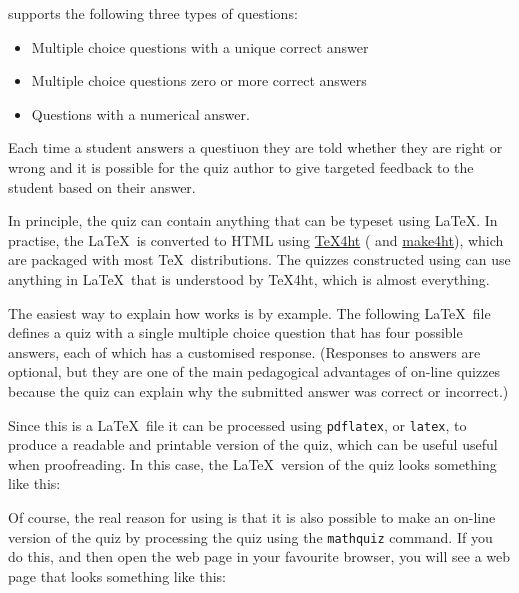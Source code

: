 \documentclass[svgnames]{article}
\begin{document}
    \MathQuiz supports the following three types of questions:
    \begin{itemize}
      \item Multiple choice questions with a unique correct answer
      \item Multiple choice questions zero or more correct answers
      \item Questions with a numerical answer.
    \end{itemize}
    Each time a student answers a questiuon they are told whether they
    are right or wrong and it is possible for the quiz author to give
    targeted feedback to the student based on their answer.

    In principle, the quiz can contain anything that can be typeset
    using \LaTeX.  In practise, the \LaTeX\ is converted to HTML using
    \href{https://www.tug.org/applications/tex4ht/mn.html}{\TeX 4ht} (
    and \href{https://github.com/michal-h21/make4ht}{make4ht}), which are
    packaged with most \TeX\ distributions. The quizzes constructed
    using \MathQuiz can use anything in \LaTeX\ that is understood by
    \TeX 4ht, which is almost everything.

    The easiest way to explain how \MathQuiz works is by example. The
    following \LaTeX\ file defines a quiz with a single multiple choice
    question that has four possible answers, each of which has a
    customised response.  (Responses to answers are optional, but they
    are one of the main pedagogical advantages of on-line quizzes because the
    quiz can explain why the submitted answer was correct or incorrect.)

    

    Since this is a \LaTeX\ file it can be processed using
    \texttt{pdflatex}, or \texttt{latex}, to produce a readable and
    printable version of the quiz, which can be useful useful when
    proofreading. In this case, the \LaTeX\ version of the quiz looks
    something like this:


    Of course, the real reason for using \MathQuiz is that it is also
    possible to make an on-line version of the quiz by processing the
    quiz using the \texttt{mathquiz} command. If you do this, and then open
    the web page in your favourite browser, you will see a web page
    that looks something like this:

\end{document}
